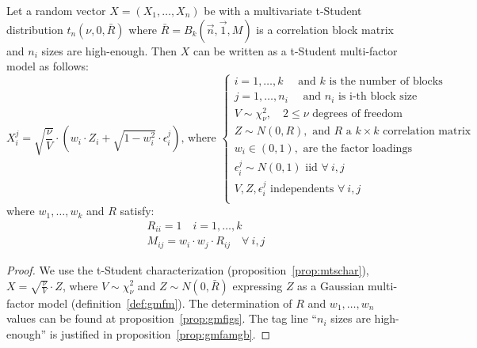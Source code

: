 \documentclass[11pt,fleqn]{book} %
\begin{document}
\begin{proposition}
	\label{prop:tmfm}
	Let a random vector $X=(X_1,\dots,X_n)$ be with a multivariate t-Student 
	distribution $t_n(\nu,0,\bar{R})$ where $\bar{R} = B_k(\vec{n},\vec{1},M)$ 
	is a correlation block matrix and $n_i$ sizes are high-enough. 
	Then $X$ can be written as a t-Student multi-factor model as follows:
	\begin{displaymath}
		X_i^j = \sqrt{\frac{\nu}{V}} \cdot 
		\left( w_i \cdot Z_i + \sqrt{1-w_i^2} \cdot \epsilon_i^j \right)
		\text{, where } \left\{
		\begin{array}{l}
			i = 1, \dots, k \quad \text{ and $k$ is the number of blocks}      \\
			j = 1, \dots, n_i \quad \text{ and $n_i$ is i-th block size}       \\
			V \sim \chi_{\nu}^2, \quad 2 \le \nu \text{ degrees of freedom}    \\
			Z \sim N(0,R), \text{ and $R$ a $k {\times} k$ correlation matrix} \\
			w_i \in (0,1), \text{ are the factor loadings }                    \\
			\epsilon_i^j \sim N(0,1) \text { iid } \forall\ i,j                \\
			V, Z, \epsilon_i^j \text{ independents } \forall\ i,j              \\
		\end{array}
		\right.
	\end{displaymath}
	where $w_1,\dots,w_k$ and $R$ satisfy:
	\begin{displaymath}
		\begin{array}{l}
			R_{ii} = 1 \quad i = 1,\dots,k \\
			M_{ij} = w_i \cdot w_j \cdot R_{ij} \quad \forall\ i,j
		\end{array}
	\end{displaymath}
\end{proposition}
\begin{proof}
	We use the t-Student characterization (proposition~\ref{prop:mtschar}),
	$X = \sqrt{\frac{\nu}{V}} \cdot Z$, where $V \sim \chi_{\nu}^2$ and 
	$Z \sim N(0,\bar{R})$ expressing $Z$ as a Gaussian multi-factor model 
	(definition~\ref{def:gmfm}). The determination of $R$ and $w_1,\dots,w_n$
	values can be found at proposition~\ref{prop:gmfigs}. The tag line 
	\enquote{$n_i$ sizes are high-enough} is justified in 
	proposition~\ref{prop:gmfamgb}.
\end{proof}
\end{document}
